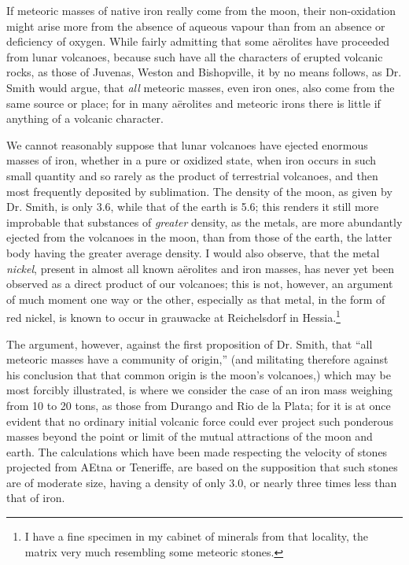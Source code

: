 \documentclass[a4paper, 12pt, oneside]{article}
\begin{document}
If meteoric masses of native iron really come from the moon, their non-oxidation might arise more from the absence of aqueous vapour than from an absence or deficiency of oxygen. While fairly admitting that some aërolites have proceeded from lunar volcanoes, because such have all the characters of erupted volcanic rocks, as those of Juvenas, Weston and Bishopville, it by no means follows, as Dr. Smith would argue, that \emph{all} meteoric masses, even iron ones, also come from the same source or place; for in many aërolites and meteoric irons there is little if anything of a volcanic character.

We cannot reasonably suppose that lunar volcanoes have ejected enormous masses of iron, whether in a pure or oxidized state, when iron occurs in such small quantity and so rarely as the product of terrestrial volcanoes, and then most frequently deposited by sublimation. The density of the moon, as given by Dr. Smith, is only 3.6, while that of the earth is 5.6; this renders it still more improbable that substances of \emph{greater} density, as the metals, are more abundantly ejected from the volcanoes in the moon, than from those of the earth, the latter body having the greater average density. I would also observe, that the metal \emph{nickel}, present in almost all known aërolites and iron masses, has never yet been observed as a direct product of our volcanoes; this is not, however, an argument of much moment one way or the other, especially as that metal, in the form of red nickel, is known to occur in grauwacke at Reichelsdorf in Hessia.\footnote{I have a fine specimen in my cabinet of minerals from that locality, the matrix very much resembling some meteoric stones.}

The argument, however, against the first proposition of Dr. Smith, that ``all meteoric masses have a community of origin,'' (and militating therefore against his conclusion that that common origin is the moon's volcanoes,) which may be most forcibly illustrated, is where we consider the case of an iron mass weighing from 10 to 20 tons, as those from Durango and Rio de la Plata; for it is at once evident that no ordinary initial volcanic force could ever project such ponderous masses beyond the point or limit of the mutual attractions of the moon and earth. The calculations which have been made respecting the velocity of stones projected from AEtna or Teneriffe, are based on the supposition that such stones are of moderate size, having a density of only 3.0, or nearly three times less than that of iron.
\end{document}
